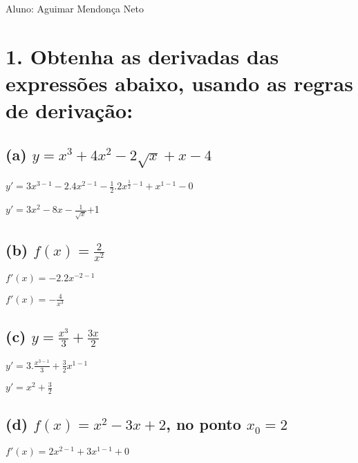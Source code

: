 Aluno: Aguimar Mendonça Neto

\hypertarget{obtenha-as-derivadas-das-expressuxf5es-abaixo-usando-as-regras-de-derivauxe7uxe3o}{%
\section{1. Obtenha as derivadas das expressões abaixo, usando as regras
de
derivação:}\label{obtenha-as-derivadas-das-expressuxf5es-abaixo-usando-as-regras-de-derivauxe7uxe3o}}

\hypertarget{a-y-x34x2-2sqrtx-x---4}{%
\subsection{\texorpdfstring{(a)
\(y = x^{3}+4x^2-2\sqrt{x} + x - 4\)}{(a) y = x\^{}\{3\}+4x\^{}2-2\textbackslash{}sqrt\{x\} + x - 4}}\label{a-y-x34x2-2sqrtx-x---4}}

\(y'=3x^{3-1} - 2.4x^{2-1}-\frac{1}{2}.2x^{\frac{1}{2}-1}+x^{1-1}-0\)

\(y'=3x^2-8x-\frac{1}{\sqrt{x}}\)+1

\hypertarget{b-fxfrac2x2}{%
\subsection{\texorpdfstring{(b)
\(f(x)=\frac{2}{x^2}\)}{(b) f(x)=\textbackslash{}frac\{2\}\{x\^{}2\}}}\label{b-fxfrac2x2}}

\(f'(x) = -2.2x^{-2-1}\)

\(f'(x)=-\frac{4}{x^3}\)

\hypertarget{c-y-fracx33frac3x2}{%
\subsection{\texorpdfstring{(c)
\(y= \frac{x^3}{3}+\frac{3x}{2}\)}{(c) y= \textbackslash{}frac\{x\^{}3\}\{3\}+\textbackslash{}frac\{3x\}\{2\}}}\label{c-y-fracx33frac3x2}}

\(y' = 3.\frac{x^{3-1}}{3} + \frac{3}{2}x^{1-1}\)

\(y' = x^2+\frac{3}{2}\)

\hypertarget{d-fxx2-3x2-no-ponto-x_02}{%
\subsection{\texorpdfstring{(d) \(f(x)=x^2-3x+2\), no ponto
\(x_0=2\)}{(d) f(x)=x\^{}2-3x+2, no ponto x\_0=2}}\label{d-fxx2-3x2-no-ponto-x_02}}

\(f'(x)=2x^{2-1}+3x^{1-1}+0\)

